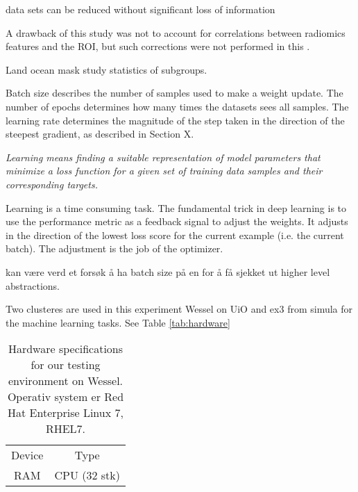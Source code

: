 data sets can be reduced without significant loss of information

A drawback of this study was not to account for correlations between radiomics features and the ROI, but such corrections were
not performed in this .

Land ocean mask study statistics of subgroups.

Batch size describes the number of samples used to make a weight update. The number of epochs determines how many times the datasets sees all samples. The learning rate determines the magnitude of the step taken in the direction of the steepest gradient, as described in Section X.

\textit{Learning means finding a suitable representation of model parameters that minimize a loss function for a given set of training data samples and their corresponding targets.} 

Learning is a time consuming task. The fundamental trick in deep learning is to use the performance metric as a feedback signal to adjust the weights. It adjusts in the direction of the lowest loss score for the current example (i.e. the current batch). The adjustment is the job of the optimizer.


kan være verd et forsøk å ha batch size på en for å få sjekket ut higher level abstractions.

Two clusteres are used in this experiment Wessel on UiO and ex3 from simula for the machine learning tasks. See Table
\ref{tab:hardware}
\begin{table}[ht]
    \centering
    \begin{tabular}{c|c}
        Device &  Type  \\
        RAM  & 
        CPU (32 stk)  &
    \end{tabular}
    \caption{Hardware specifications for our testing environment on Wessel. Operativ system er Red Hat Enterprise Linux 7, RHEL7.}
    \label{tab:hardware_wessel}
\end{table}




